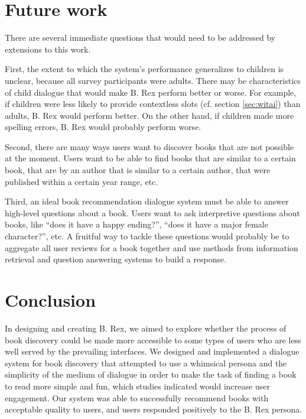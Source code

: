 \documentclass[11pt,a4paper]{article}
\begin{document}
\section{Future work}

There are several immediate questions that would need to be addressed by extensions to this work.

First, the extent to which the system's performance generalizes to children is unclear, because all survey participants were adults. There may be characteristics of child dialogue that would make B. Rex perform better or worse. For example, if children were less likely to provide contextless slots (cf. section \ref{sec:witai}) than adults, B. Rex would perform better. On the other hand, if children made more spelling errors, B. Rex would probably perform worse. 

Second, there are many ways users want to discover books that are not possible at the moment. Users want to be able to find books that are similar to a certain book, that are by an author that is similar to a certain author, that were published within a certain year range, etc.

Third, an ideal book recommendation dialogue system must be able to answer high-level questions about a book. Users want to ask interpretive questions about books, like ``does it have a happy ending?'', ``does it have a major female character?'', etc. A fruitful way to tackle these questions would probably be to aggregate all user reviews for a book together and use methods from information retrieval and question answering systems to build a response.


\section{Conclusion}

In designing and creating B. Rex, we aimed to explore whether the process of book discovery could be made more accessible to some types of users who are less well served by the prevailing interfaces. We designed and implemented a dialogue system for book discovery that attempted to use a whimsical persona and the simplicity of the medium of dialogue in order to make the task of finding a book to read more simple and fun, which studies indicated would increase user engagement. Our system was able to successfully recommend books with acceptable quality to users, and users responded positively to the B. Rex persona.





\end{document}

